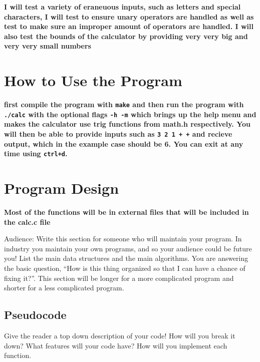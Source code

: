 \documentclass{article}
\begin{document}
\textbf{I will test a variety of eraneuous inputs, such as letters and special characters, I will test to ensure unary operators are handled as well as test to make sure an improper amount of operators are handled. I will also test the bounds of the calculator by providing very very big and very very small numbers}

\section*{How to Use the Program}

\textbf{first compile the program with \lstinline{make} and then run the program with \lstinline{./calc} with the optional flags \lstinline{-h -m} which brings up the help menu and makes the calculator use trig functions from math.h respectively. You will then be able to provide inputs such as \lstinline{3 2 1 + +} and recieve output, which in the example case should be 6. You can exit at any time using \lstinline{ctrl+d}.}

\section*{Program Design}

\textbf{Most of the functions will be in external files that will be included in the calc.c file}

Audience: Write this section for someone
who will maintain your program.
In industry you maintain your own
programs, and so your audience could be
future you! List
the main data structures and the main
algorithms. You are answering the basic
question, ``How is this thing organized
so that I can have a chance of fixing
it?''. This section will be longer for a
more complicated program and shorter for
a less complicated program.

\subsection*{Pseudocode}
Give the reader a top down description of your code! How will you break it down? What features will your code have? 
How will you implement each function. 
\end{document}
